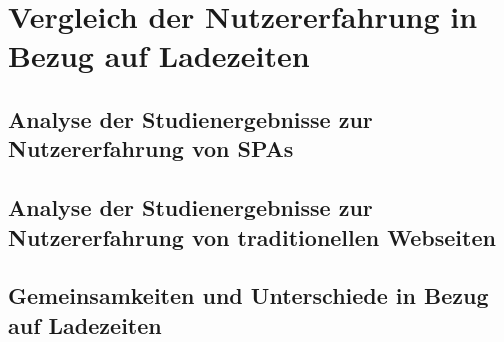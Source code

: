 \section{Vergleich der Nutzererfahrung in Bezug auf Ladezeiten}
\subsection{Analyse der Studienergebnisse zur Nutzererfahrung von SPAs}
\subsection{Analyse der Studienergebnisse zur Nutzererfahrung von traditionellen Webseiten}
\subsection{Gemeinsamkeiten und Unterschiede in Bezug auf Ladezeiten}